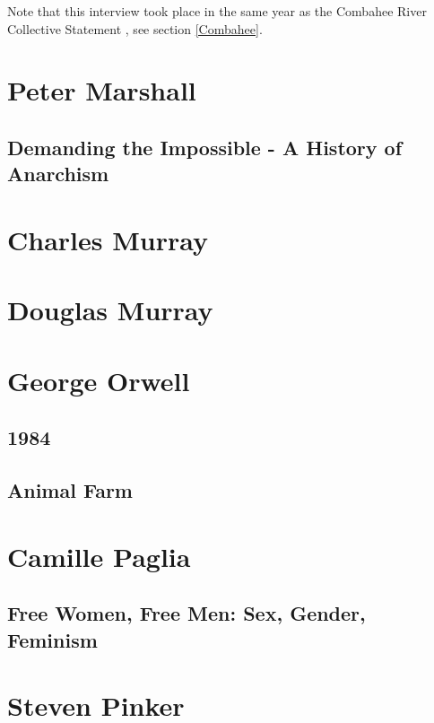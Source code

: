 \documentclass[10pt,titlepage]{book}
\begin{document}
Note that this interview took place in the same year as the Combahee River Collective Statement \cite{combahee-statement}, see section \ref{Combahee}.

\section{Peter Marshall}\label{MarshallPeter}

\subsection{Demanding the Impossible - A History of Anarchism \cite{marshallHA}}

\section{Charles Murray \cite{murrayc-tbc,murrayc-hd}}

\section{Douglas Murray}\label{MurrayDouglas}

\cite{murrayd-vi,murrayd-sde,murrayd-tmc}

\section{George Orwell}\label{OrwellGeorge}

\subsection{1984}

\cite{orwell-1984}

\subsection{Animal Farm \cite{orwell-af}}

\section{Camille Paglia}\label{PagliaCamile}

\subsection{Free Women, Free Men: Sex, Gender, Feminism \cite{paglia-fw}}

\section{Steven Pinker}\label{PinkerSteven}
\end{document}
